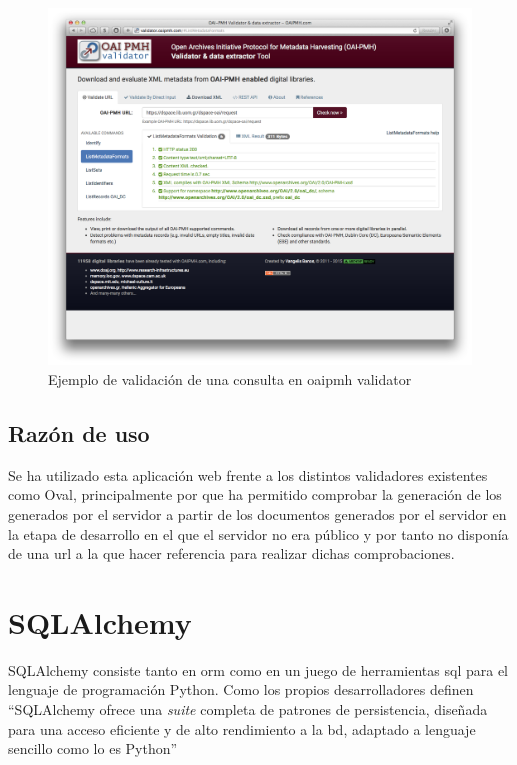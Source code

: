 \begin{figure}[!htbp]
	\centering
	\includegraphics[scale=0.25]{fig/oaipmh_validator_example}
	\caption{Ejemplo de validación de una consulta en \acrshort{oaipmh} validator}
	\label{fig:oai_validator}
\end{figure}

\subsection{Razón de uso}

Se ha utilizado esta aplicación web frente a los distintos validadores existentes como Oval\cite{Oval}, principalmente por que ha permitido comprobar la generación de los  generados por el servidor a partir de los documentos generados por el servidor en la etapa de desarrollo en el que el servidor no era público y por tanto no disponía de una \acrshort{url} a la que hacer referencia para realizar dichas comprobaciones.

\section{SQLAlchemy}

SQLAlchemy\cite{SQLAlchemy} consiste tanto en \acrfull{orm} como en un juego de herramientas \acrshort{sql} para el lenguaje de programación Python. Como los propios desarrolladores definen ``SQLAlchemy ofrece una \textit{suite} completa de patrones de persistencia, diseñada para una acceso eficiente y de alto rendimiento a la \acrlong{bd}, adaptado a lenguaje sencillo como lo es Python''

